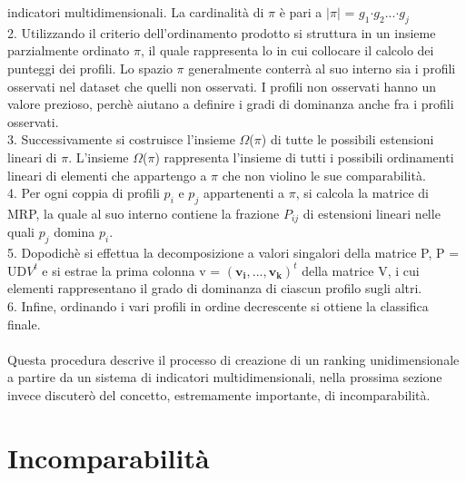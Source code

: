 \documentclass[a4paper,12pt, openright]{report}
\begin{document}
indicatori multidimensionali. La cardinalità di $\pi$ è pari a $\vert$$\pi$$\vert$  = $g_{1}$$\cdot$$g_{2}$...$\cdot$$g_{j}$\\
2. Utilizzando il criterio dell'ordinamento prodotto si struttura in un insieme parzialmente ordinato $\pi$, il quale rappresenta lo 
 in cui collocare il calcolo dei punteggi dei profili. Lo spazio $\pi$ generalmente conterrà al suo interno sia i profili
osservati nel dataset che quelli non osservati. I profili non osservati hanno un valore prezioso, perchè aiutano a definire i 
gradi di dominanza anche fra i profili osservati. \\
3. Successivamente si costruisce l'insieme $\Omega$($\pi$) di tutte le possibili estensioni lineari di $\pi$. L'insieme $\Omega$($\pi$)
rappresenta l'insieme di tutti i possibili ordinamenti lineari di elementi che appartengo a $\pi$ che non violino le sue comparabilità.\\
4. Per ogni coppia di profili $p_{i}$ e $p_{j}$ appartenenti a $\pi$, si calcola la matrice di MRP, la quale al suo interno contiene
la frazione $P_{ij}$ di estensioni lineari nelle quali $p_{j}$ domina $p_{i}$. \\
5. Dopodichè si effettua la decomposizione a valori singalori della matrice P, P = UD$V^t$ e si estrae la prima colonna 
v = $(\mathbf{v_{i}, ..., v_{k}})^{t}$ della matrice V, i cui elementi rappresentano il grado di dominanza di ciascun profilo sugli altri.\\
6. Infine, ordinando i vari profili in ordine decrescente si ottiene la classifica finale. \\
\\
Questa procedura descrive il processo di creazione di un ranking unidimensionale a partire da un sistema di indicatori multidimensionali, nella prossima sezione
invece discuterò del concetto, estremamente importante, di incomparabilità.  
\\

\newpage

\section{Incomparabilità}
\end{document}
